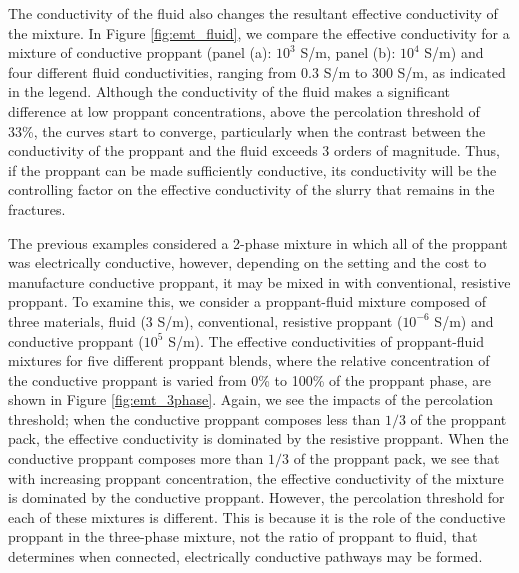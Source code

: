 The conductivity of the fluid also changes the resultant effective conductivity of the mixture. In Figure \ref{fig:emt_fluid}, we compare the effective conductivity for a mixture of conductive proppant (panel (a): $10^3$ S/m, panel (b): $10^4$ S/m) and four different fluid conductivities, ranging from 0.3 S/m to 300 S/m, as indicated in the legend. Although the conductivity of the fluid makes a significant difference at low proppant concentrations, above the percolation threshold of 33\%, the curves start to converge, particularly when the contrast between the conductivity of the proppant and the fluid exceeds 3 orders of magnitude. Thus, if the proppant can be made sufficiently conductive, its conductivity will be the controlling factor on the effective conductivity of the slurry that remains in the fractures.




The previous examples considered a 2-phase mixture in which all of the proppant was electrically conductive, however, depending on the setting and the cost to manufacture conductive proppant, it may be mixed in with conventional, resistive proppant. To examine this, we consider a proppant-fluid mixture composed of three materials, fluid ($3$ S/m), conventional, resistive proppant ($10^{-6}$ S/m) and conductive proppant ($10^5$ S/m). The effective conductivities of proppant-fluid mixtures for five different proppant blends, where the relative concentration of the conductive proppant is varied from 0\% to 100\% of the proppant phase, are shown in Figure \ref{fig:emt_3phase}. Again, we see the impacts of the percolation threshold; when the conductive proppant composes less than $1/3$ of the proppant pack, the effective conductivity is dominated by the resistive proppant. When the conductive proppant composes more than $1/3$ of the proppant pack, we see that with increasing proppant concentration, the effective conductivity of the mixture is dominated by the conductive proppant. However, the percolation threshold for each of these mixtures is different. This is because it is the role of the conductive proppant in the three-phase mixture, not the ratio of proppant to fluid, that determines when connected, electrically conductive pathways may be formed.




